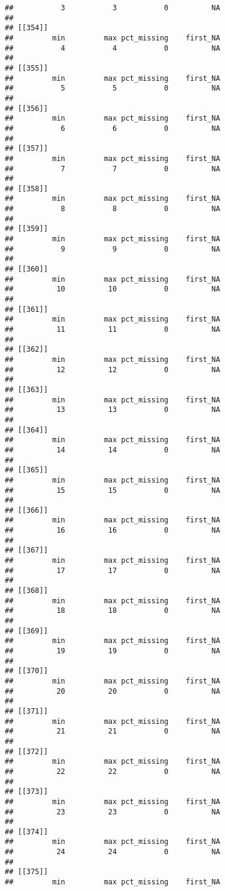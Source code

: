 \documentclass[
]{article}
\begin{document}
\begin{verbatim}
##           3           3           0          NA 
## 
## [[354]]
##         min         max pct_missing    first_NA 
##           4           4           0          NA 
## 
## [[355]]
##         min         max pct_missing    first_NA 
##           5           5           0          NA 
## 
## [[356]]
##         min         max pct_missing    first_NA 
##           6           6           0          NA 
## 
## [[357]]
##         min         max pct_missing    first_NA 
##           7           7           0          NA 
## 
## [[358]]
##         min         max pct_missing    first_NA 
##           8           8           0          NA 
## 
## [[359]]
##         min         max pct_missing    first_NA 
##           9           9           0          NA 
## 
## [[360]]
##         min         max pct_missing    first_NA 
##          10          10           0          NA 
## 
## [[361]]
##         min         max pct_missing    first_NA 
##          11          11           0          NA 
## 
## [[362]]
##         min         max pct_missing    first_NA 
##          12          12           0          NA 
## 
## [[363]]
##         min         max pct_missing    first_NA 
##          13          13           0          NA 
## 
## [[364]]
##         min         max pct_missing    first_NA 
##          14          14           0          NA 
## 
## [[365]]
##         min         max pct_missing    first_NA 
##          15          15           0          NA 
## 
## [[366]]
##         min         max pct_missing    first_NA 
##          16          16           0          NA 
## 
## [[367]]
##         min         max pct_missing    first_NA 
##          17          17           0          NA 
## 
## [[368]]
##         min         max pct_missing    first_NA 
##          18          18           0          NA 
## 
## [[369]]
##         min         max pct_missing    first_NA 
##          19          19           0          NA 
## 
## [[370]]
##         min         max pct_missing    first_NA 
##          20          20           0          NA 
## 
## [[371]]
##         min         max pct_missing    first_NA 
##          21          21           0          NA 
## 
## [[372]]
##         min         max pct_missing    first_NA 
##          22          22           0          NA 
## 
## [[373]]
##         min         max pct_missing    first_NA 
##          23          23           0          NA 
## 
## [[374]]
##         min         max pct_missing    first_NA 
##          24          24           0          NA 
## 
## [[375]]
##         min         max pct_missing    first_NA 

\end{verbatim}
\end{document}
